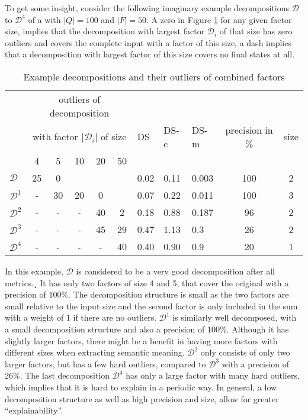 To get some insight, consider the following imaginary example decompositions $\mathcal{D}$ to $\mathcal{D}^4$ of a \DFA with $|Q| = 100$ and $|F| = 50$.
A zero in Figure \ref{tab:metric-example-decompositions} for any given factor size, implies that the decomposition with largest factor $\mathcal{D}_i$ of that size has zero outliers and covers the complete input \DFA with a factor of this size, a dash implies that a decomposition with largest factor of this size covers no final states at all.
\begin{table}[h]
	\centering
	\begin{tabular}{l|ccccc|lllcc}
		& \multicolumn{5}{c}{outliers of decomposition}  & & & & & \\
		& \multicolumn{5}{c}{with factor $|\mathcal{D}_i|$ of size} & DS & DS-c & DS-m & precision in \% & size \\
		& 4 & 5 & 10 & 20 & 50 & & & & & \\
		\hline
		$\mathcal{D}$ & 25 & 0 & &  & & 0.02 & 0.11 & 0.003 & 100 & 2\\		
		$\mathcal{D}^1$ & - & 30 & 20 & 0 & & 0.07 & 0.22& 0.011 & 100 & 3\\
		$\mathcal{D}^2$ & - & - & - & 40 & 2 & 0.18 & 0.88 & 0.187 &  96 & 2\\
		$\mathcal{D}^3$ & - & - & - & 45 & 29 & 0.47 & 1.13 & 0.3 & 26 & 2\\
		$\mathcal{D}^4$ & - & - & - & - & 40 & 0.40 & 0.90 & 0.9 & 20 & 1\\
	\end{tabular}
	\caption{Example decompositions and their outliers of combined factors}
	\label{tab:metric-example-decompositions}
\end{table}
In this example, $\mathcal{D}$ is considered to be a very good decomposition after all metrics.¸
It has only two factors of size 4 and 5, that cover the original \DFA with a precision of 100\%.
The decomposition structure is small as the two factors are small relative to the input size and the second factor is only included in the sum with a weight of 1 if there are no outliers.
$\mathcal{D}^1$ is similarly well decomposed, with a small decomposition structure and also a precision of 100\%.
Although it has slightly larger factors, there might be a benefit in having more factors with different sizes when extracting semantic meaning.
$\mathcal{D}^2$ only consists of only two larger factors, but has a few hard outliers, compared to $\mathcal{D}^3$ with a precision of 26\%.
The last decomposition $\mathcal{D}^4$ has only a large factor with many hard outliers, which implies that it is hard to explain in a periodic way.
In general, a low decomposition structure as well as high precision and size, allow for greater \enquote{explainability}.

